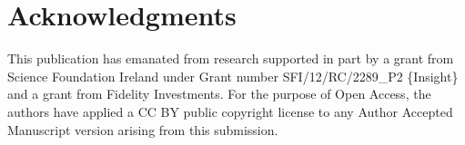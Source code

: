 \documentclass[11pt]{article}
\begin{document}
\section*{Acknowledgments}

This publication has emanated from research supported in part by a
grant from Science Foundation Ireland under Grant number
SFI/12/RC/2289\_P2 \{Insight\} and a grant from Fidelity Investments. For the purpose of Open Access, the authors have
applied a CC BY public copyright license to any Author Accepted
Manuscript version arising from this submission.

%


\appendix


\end{document}
